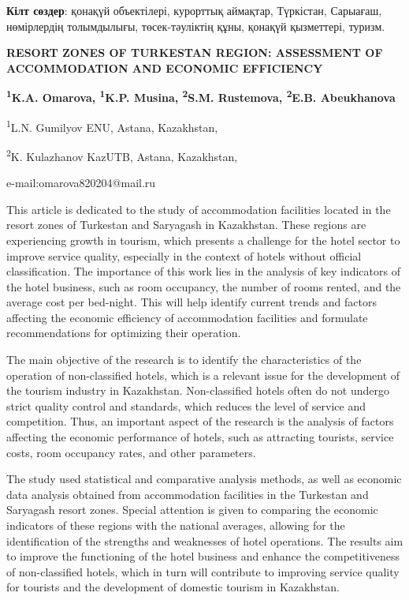 {\bfseries Кілт сөздер}: қонақүй объектілері, курорттық аймақтар,
Түркістан, Сарыағаш, нөмірлердің толымдылығы, төсек-тәуліктің құны,
қонақүй қызметтері, туризм.

\begin{articleheader}
{\bfseries RESORT ZONES OF TURKESTAN REGION: ASSESSMENT OF ACCOMMODATION
AND ECONOMIC EFFICIENCY}

{\bfseries
\textsuperscript{1}K.A. Omarova\textsuperscript{\envelope },
\textsuperscript{1}K.P. Musina,
\textsuperscript{2}S.M. Rustemova,
\textsuperscript{2}E.B. Abeukhanova
}
\end{articleheader}

\begin{affiliation}
\textsuperscript{1}L.N. Gumilyov ENU, Astana, Kazakhstan,

\textsuperscript{2}K. Kulazhanov KazUTB, Astana, Kazakhstan,

e-mail:omarova820204@mail.ru
\end{affiliation}

This article is dedicated to the study of accommodation facilities
located in the resort zones of Turkestan and Saryagash in Kazakhstan.
These regions are experiencing growth in tourism, which presents a
challenge for the hotel sector to improve service quality, especially in
the context of hotels without official classification. The importance of
this work lies in the analysis of key indicators of the hotel business,
such as room occupancy, the number of rooms rented, and the average cost
per bed-night. This will help identify current trends and factors
affecting the economic efficiency of accommodation facilities and
formulate recommendations for optimizing their operation.

The main objective of the research is to identify the characteristics of
the operation of non-classified hotels, which is a relevant issue for
the development of the tourism industry in Kazakhstan. Non-classified
hotels often do not undergo strict quality control and standards, which
reduces the level of service and competition. Thus, an important aspect
of the research is the analysis of factors affecting the economic
performance of hotels, such as attracting tourists, service costs, room
occupancy rates, and other parameters.

The study used statistical and comparative analysis methods, as well as
economic data analysis obtained from accommodation facilities in the
Turkestan and Saryagash resort zones. Special attention is given to
comparing the economic indicators of these regions with the national
averages, allowing for the identification of the strengths and
weaknesses of hotel operations. The results aim to improve the
functioning of the hotel business and enhance the competitiveness of
non-classified hotels, which in turn will contribute to improving
service quality for tourists and the development of domestic tourism in
Kazakhstan.

